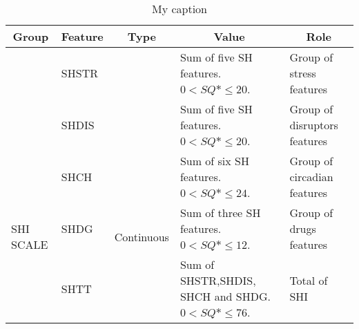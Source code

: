 \documentclass[10pt,letterpaper,oneside]{article}
\begin{document}
\begin{table}[]
	\centering
	\caption{My caption}
	\label{my-label}
	\begin{tabular}{|l|l|l|p{4cm}|p{4cm}|}
		\hline
		\multicolumn{1}{|c|}{\textbf{Group}} & \multicolumn{1}{c|}{\textbf{Feature}} & \multicolumn{1}{c|}{\textbf{Type}} & \multicolumn{1}{c|}{\textbf{Value}}                    & \multicolumn{1}{c|}{\textbf{Role}} \\ \hline
		          & SHSTR                                 &         & Sum of five SH features. $ 0 < SQ*\leq 20 $.           & Group of stress features           \\ \cline{2-2} \cline{4-5} 
		& SHDIS                                 &                                    & Sum of five SH features. $ 0 < SQ*\leq 20 $.           & Group of disruptors features       \\ \cline{2-2} \cline{4-5} 
		\multirow{5}{*}{SHI SCALE} & SHCH          &       \multirow{5}{*}{Continuous}                             & Sum of six SH features. $ 0 < SQ*\leq 24 $.            & Group of circadian features        \\ \cline{2-2} \cline{4-5} 
		& SHDG                                  &                                    & Sum of three SH features. $ 0 < SQ*\leq 12 $.          & Group of drugs features            \\ \cline{2-2} \cline{4-5} 
		& SHTT                                  &                                    & Sum of SHSTR,SHDIS, SHCH and SHDG. $ 0 < SQ*\leq 76 $. & Total of SHI                       \\ \hline
	\end{tabular}
\end{table}
\end{document}
